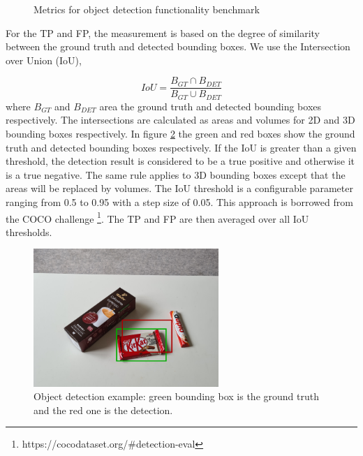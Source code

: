 \begin{figure}[h!]
	\caption{Metrics for object detection functionality benchmark}
	\label{fig:ObjectDetectionMetrics}
\end{figure}

For the TP and FP, the measurement is based on the degree of similarity between the ground truth and detected bounding boxes. We use the Intersection over Union (IoU),

\begin{equation}
IoU = \frac{B_{GT} \cap B_{DET}}{B_{GT} \cup B_{DET}}
\end{equation}
where $B_{GT}$ and $B_{DET}$ area the ground truth and detected bounding boxes respectively. The intersections are calculated as areas and volumes for 2D and 3D bounding boxes respectively.
In figure \ref{fig:ObjectDetectionSample} the green and red boxes show the ground truth and detected bounding boxes respectively. If the IoU is greater than a given threshold, the detection result is considered to be a true positive and otherwise it is a true negative. The same rule applies to 3D bounding boxes except that the areas will be replaced by volumes.
The IoU threshold is a configurable parameter ranging from 0.5 to 0.95 with a step size of 0.05. This approach is borrowed from the COCO challenge \footnote{https://cocodataset.org/\#detection-eval}. The TP and FP are then averaged over all IoU thresholds.


\begin{figure} [h!]
	\begin{center}
		\includegraphics[width=7cm]{fig/FBM/erl/perception/sciroc-op-chocholates-bbox.png}
	\end{center}
	\caption{Object detection example: green bounding box is the ground truth and the red one is the detection.}
	\label{fig:ObjectDetectionSample}
\end{figure}

